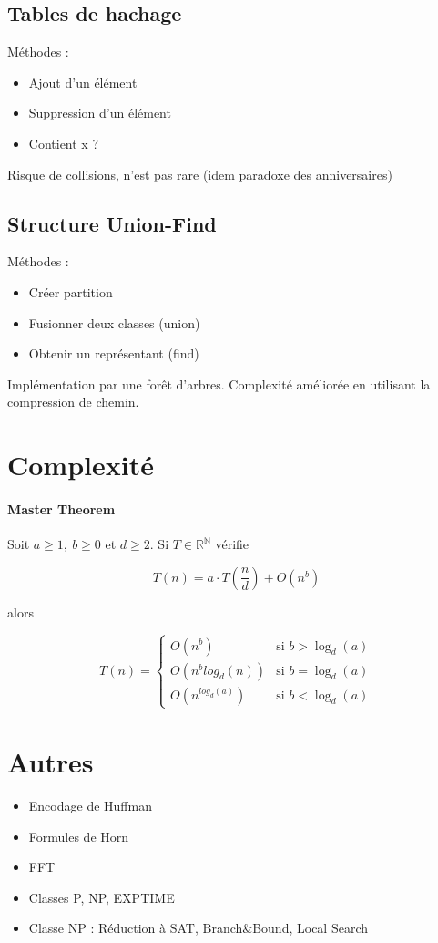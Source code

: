\documentclass[10pt,a4paper]{article}
\begin{document}
\subsection{Tables de hachage}
	
Méthodes : 
\begin{itemize}[noitemsep]
	\item Ajout d'un élément
	\item Suppression d'un élément
	\item Contient x ?
\end{itemize}

Risque de collisions, n'est pas rare (idem paradoxe des anniversaires)

\subsection{Structure Union-Find}

Méthodes : 
\begin{itemize}[noitemsep]
	\item Créer partition
	\item Fusionner deux classes (union)
	\item Obtenir un représentant (find)
\end{itemize}

Implémentation par une forêt d'arbres. %
Complexité améliorée en utilisant la compression de chemin.

\section{Complexité}

\paragraph{Master Theorem} Soit $a \geq 1,~b \geq 0$ et $d \geq 2$. Si $T \in \mathbb{R}^{\mathbb{N}}$ vérifie 

\[ T(n) = a \cdot T \left( \dfrac{n}{d} \right) + O \left( n^b \right) \]

\noindent alors

\[
T(n) = \left\{
    \begin{array}{ll}
        O\left( n^b \right) & \mbox{si } b > \log_d(a) \\
        O\left(n^b log_d(n)\right) & \mbox{si } b = \log_d(a) \\
        O\left( n^{log_d(a)} \right) & \mbox{si } b < \log_d(a)
    \end{array}
\right.
\]

\section{Autres}

\begin{itemize}[noitemsep]
	\item Encodage de Huffman
	\item Formules de Horn
	\item FFT
	\item Classes P, NP, EXPTIME
	\item Classe NP : Réduction à SAT, Branch\&Bound, Local Search
\end{itemize}
\end{document}
